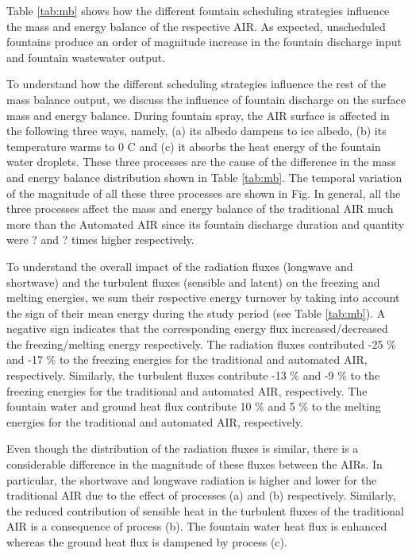 \documentclass[tc, manuscript]{copernicus}
\begin{document}
Table \ref{tab:mb} shows how the different fountain scheduling strategies influence the mass
and energy balance of the respective AIR. As expected, unscheduled fountains produce an order of magnitude
increase in the fountain discharge input and fountain wastewater output. 

To understand how the different scheduling strategies influence the rest of the mass balance output, we discuss
the influence of fountain discharge on the surface mass and energy balance. During fountain spray, the AIR
surface is affected in the following three ways, namely, (a) its albedo dampens to ice albedo, (b) its
temperature warms to 0 C and (c) it absorbs the heat energy of the fountain water droplets. These three
processes are the cause of the difference in the mass and energy balance distribution shown in Table
\ref{tab:mb}. The temporal variation of the magnitude of all these three processes are shown in Fig. In general,
all the three processes affect the mass and energy balance of the traditional AIR much more than the Automated
AIR since its fountain discharge duration and quantity were ? and ? times higher respectively. 

To understand the overall impact of the radiation fluxes (longwave and shortwave) and the turbulent fluxes
(sensible and latent) on the freezing and melting energies, we sum their respective energy turnover by taking
into account the sign of their mean energy during the study period (see Table \ref{tab:mb}). A negative sign
indicates that the corresponding energy flux increased/decreased the freezing/melting energy respectively.  The
radiation fluxes contributed -25 \% and -17 \% to the freezing energies for the traditional and automated AIR,
respectively.  Similarly, the turbulent fluxes contribute -13 \% and -9 \% to the freezing energies for the
traditional and automated AIR, respectively. The fountain water and ground heat flux contribute 10 \% and 5 \%
to the melting energies for the traditional and automated AIR, respectively. 

Even though the distribution of the radiation fluxes is similar, there is a considerable difference in the
magnitude of these fluxes between the AIRs. In particular, the shortwave and longwave radiation is higher and
lower for the traditional AIR due to the effect of processes (a) and (b) respectively. Similarly, the reduced
contribution of sensible heat in the turbulent fluxes of the traditional AIR is a consequence of process (b).
The fountain water heat flux is enhanced whereas the ground heat flux is dampened by process (c).
\end{document}
